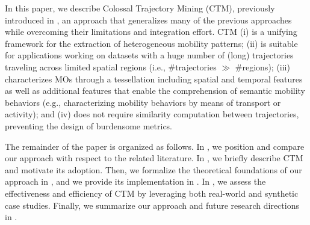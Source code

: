 \documentclass[
]{ceurart}
\begin{document}
In this paper, we describe Colossal Trajectory Mining (CTM), previously introduced in \cite{DBLP:journals/eswa/FranciaGG24}, an approach that generalizes many of the previous approaches while overcoming their limitations and integration effort.
CTM 
(i) is a unifying framework for the extraction of heterogeneous mobility patterns; 
(ii) is suitable for applications working on datasets with a huge number of (long) trajectories traveling across limited spatial regions (i.e., \#trajectories $\gg$ \#regions);
(iii) characterizes MOs through a tessellation including spatial and temporal features as well as additional features that enable the comprehension of semantic mobility behaviors \citep{DBLP:journals/tist/Yan0PSA13} (e.g., characterizing mobility behaviors by means of transport or activity);
and (iv) does not require similarity computation between trajectories, preventing the design of burdensome metrics.

The remainder of the paper is organized as follows.
In , we position and compare our approach with respect to the related literature.
In , we briefly describe CTM and motivate its adoption.
Then, we formalize the theoretical foundations of our approach in , and we provide its implementation in .
In , we assess the effectiveness and efficiency of CTM by leveraging both real-world and synthetic case studies. 
Finally, we summarize our approach and future research directions in .
\end{document}
